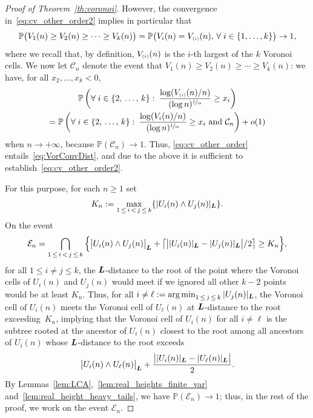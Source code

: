 \documentclass[10pt]{amsart}
\theoremstyle{definition}\newtheorem{defi}[theo]{Definition}\newtheorem{rema}[theo]{Remark}\newtheorem{exam}[theo]{Example}\newtheorem{exem}[theo]{Example}\newtheorem{nota}[theo]{Notation}
\DeclareMathOperator*{\argmin}{arg\,min}
\newcommand{\bs}{\ensuremath{\boldsymbol}}
\newcommand{\sss}{\ensuremath{\scriptscriptstyle}}
\newcommand{\bbP}{\mathbb{P}}
\newcommand{\clC}{\mathcal{C}}
\newcommand{\clE}{\mathcal{E}}
\let\oldforall\forall
\renewcommand*{\forall}{\mathrel{\oldforall}}
\begin{document}
\begin{proof}[Proof of Theorem~\ref{th:voronoi}]
However, the convergence in~\eqref{eq:cv_other_order2} implies in particular that
\[
\bbP\big(V_1(n)\geq V_2(n)\geq\cdots\geq V_k(n)\big) = \bbP \big(V_i(n) = V_{\sss (i)}(n), \,\forall i \in \{1, \ldots, k\} \big)
\to 1,
\]
where we recall that, by definition, $V_{\sss (i)}(n)$ is the $i$-th largest of the $k$ Voronoi cells. We now let $\clC_n$ denote the event that $V_1(n)\geq V_2(n)\geq\cdots\geq V_k(n)$: we have, for all $x_2, \ldots, x_k<0$,
\begin{multline*}
\bbP\left(\forall i \in \{2, \,\ldots,\,k\} \, \colon\, \frac{\log (V_{\sss (i)}(n)/n)}{(\log n)^{\nicefrac1\alpha}}\geq x_i\right)\\
=\bbP\left(\forall i \in \{2,\,\ldots,\,k\} \, \colon\, \frac{\log (V_i(n)/n)}{(\log n)^{\nicefrac1\alpha}}\geq x_i \text{ and }\clC_n\right)+o(1)
\end{multline*}
when $n\to+\infty$, because $\bbP(\clC_n)\to 1$. Thus, \eqref{eq:cv_other_order} entails~\eqref{eq:VorConvDist}, and due to the above it is sufficient to establish~\eqref{eq:cv_other_order2}.


For this purpose, for each $n\geq 1$ set
\begin{equation}\label{eq:Kdef}
K_n := \max_{1\,\leq\,i\,<\,j\,\leq\, k}\{|U_i(n)\wedge U_j(n)|_{\bs L}\}.
\end{equation}
On the event
\begin{equation}\label{eq:def_En}
\clE_n = \bigcap_{1\,\leq\,i\,<\,j\,\leq\,k}\Big\{\big|U_i(n)\wedge U_j(n)\big|_{\bs L}+\big\lceil\big||U_i(n)|_{\bs L} - |U_j(n)|_{\bs L}\big|/2\big\rceil\geq K_n\Big\},
\end{equation}
for all $1\leq i\neq j\leq k$, the $\bs L$-distance to the root of the point where the Voronoi cells of $U_i(n)$ and $U_j(n)$ would meet if we ignored all other $k-2$ points would be at least $K_n$. Thus, for all $i\neq \ell:=\argmin_{1\,\leq\,j\,\leq\,k} |U_j(n)|_{\bs L}$, the Voronoi cell of $U_i(n)$ meets the Voronoi cell of $U_\ell(n)$ at $\bs L$-distance to the root exceeding~$K_n$, implying that the Voronoi cell of $U_i(n)$ for all $i\neq \ell$ is the subtree rooted at the ancestor of $U_i(n)$ closest to the root among all ancestors of $U_i(n)$ whose $\bs L$-distance to the root exceeds
\begin{equation}\label{eq:constSpeed}
\big|U_i(n)\wedge U_\ell(n)\big|_{\bs L}+\frac{\big||U_i(n)|_{\bs L} - |U_\ell(n)|_{\bs L}\big|}2.
\end{equation}
By Lemmas~\ref{lem:LCA},~\ref{lem:real_heights_finite_var} and~\ref{lem:real_height_heavy_tails}, we have $\bbP(\clE_n) \to 1$; thus, in the rest of the proof, we work on the event $\clE_n$.


\end{proof}
\end{document}
